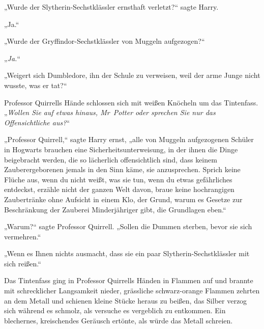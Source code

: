 „Wurde der Slytherin-Sechstklässler ernsthaft verletzt?“ sagte Harry.

„Ja.“

„Wurde der Gryffindor-Sechstklässler von Muggeln aufgezogen?“

„\emph{Ja.}“

„Weigert sich Dumbledore, ihn der Schule zu verweisen, weil der arme Junge nicht wusste, was er tat?“

Professor Quirrells Hände schlossen sich mit weißen Knöcheln um das Tintenfass. „\emph{Wollen Sie auf etwas hinaus, Mr~Potter oder sprechen Sie nur das} \emph{Offensichtliche aus?}“

„Professor Quirrell,“ sagte Harry ernst, „alle von Muggeln aufgezogenen Schüler in Hogwarts brauchen eine Sicherheitsunterweisung, in der ihnen die Dinge beigebracht werden, die so lächerlich offensichtlich sind, dass keinem Zauberergeborenen jemals in den Sinn käme, sie anzusprechen. Sprich keine Flüche aus, wenn du nicht weißt, was sie tun, wenn du etwas gefährliches entdeckst, erzähle nicht der ganzen Welt davon, braue keine hochrangigen Zaubertränke ohne Aufsicht in einem Klo, der Grund, warum es Gesetze zur Beschränkung der Zauberei Minderjähriger gibt, die Grundlagen eben.“

„Warum?“ sagte Professor Quirrell. „Sollen die Dummen sterben, bevor sie sich vermehren.“

„Wenn es Ihnen nichts ausmacht, dass sie ein paar Slytherin-Sechstklässler mit sich reißen.“

Das Tintenfass ging in Professor Quirrells Händen in Flammen auf und brannte mit schrecklicher Langsamkeit nieder, grässliche schwarz-orange Flammen zehrten an dem Metall und schienen kleine Stücke heraus zu beißen, das Silber verzog sich während es schmolz, als versuche es vergeblich zu entkommen. Ein blechernes, kreischendes Geräusch ertönte, als würde das Metall schreien.

